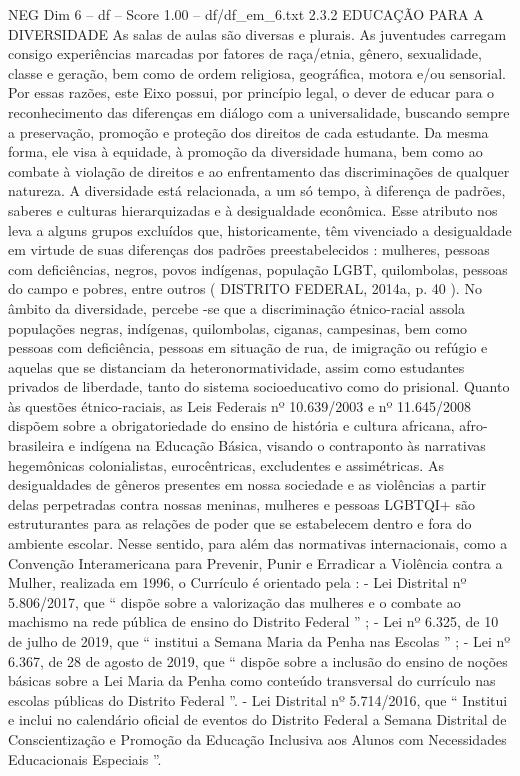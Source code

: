 \begin{textsample}{NEG Dim 6 – df – Score 1.00 – df/df\_em\_6.txt}  \label{ex:f6_neg_170}
2.3.2 EDUCAÇÃO PARA A DIVERSIDADE As salas de aulas são diversas e plurais.
As juventudes carregam consigo experiências marcadas por fatores de raça/etnia, gênero, sexualidade, classe e geração, bem como de ordem religiosa, geográfica, motora e/ou sensorial.
Por essas razões, este Eixo possui, por princípio legal, o dever de educar para o reconhecimento das diferenças em diálogo com a universalidade, buscando sempre a preservação, promoção e proteção dos direitos de cada estudante.
Da mesma forma, ele visa à equidade, à promoção da diversidade humana, bem como ao combate à violação de direitos e ao enfrentamento das discriminações de qualquer natureza.
A diversidade está relacionada, a um só tempo, à diferença de padrões, saberes e culturas hierarquizadas e à desigualdade econômica.
Esse atributo nos leva a alguns grupos excluídos que, historicamente, têm vivenciado a desigualdade em virtude de suas diferenças dos padrões preestabelecidos : mulheres, pessoas com deficiências, negros, povos indígenas, população LGBT, quilombolas, pessoas do campo e pobres, entre outros ( DISTRITO FEDERAL, 2014a, p. 40 ).
No âmbito da diversidade, percebe -se que a discriminação étnico-racial assola populações negras, indígenas, quilombolas, ciganas, campesinas, bem como pessoas com deficiência, pessoas em situação de rua, de imigração ou refúgio e aquelas que se distanciam da heteronormatividade, assim como estudantes privados de liberdade, tanto do sistema socioeducativo como do prisional.
Quanto às questões étnico-raciais, as Leis Federais nº 10.639/2003 e nº 11.645/2008 dispõem sobre a obrigatoriedade do ensino de história e cultura africana, afro-brasileira e indígena na Educação Básica, visando o contraponto às narrativas hegemônicas colonialistas, eurocêntricas, excludentes e assimétricas.
As desigualdades de gêneros presentes em nossa sociedade e as violências a partir delas perpetradas contra nossas meninas, mulheres e pessoas LGBTQI+ são estruturantes para as relações de poder que se estabelecem dentro e fora do ambiente escolar.
Nesse sentido, para além das normativas internacionais, como a Convenção Interamericana para Prevenir, Punir e Erradicar a Violência contra a Mulher, realizada em 1996, o Currículo é orientado pela : - Lei Distrital nº 5.806/2017, que “ dispõe sobre a valorização das mulheres e o combate ao machismo na rede pública de ensino do Distrito Federal ” ; - Lei nº 6.325, de 10 de julho de 2019, que “ institui a Semana Maria da Penha nas Escolas ” ; - Lei nº 6.367, de 28 de agosto de 2019, que “ dispõe sobre a inclusão do ensino de noções básicas sobre a Lei Maria da Penha como conteúdo transversal do currículo nas escolas públicas do Distrito Federal ”. - Lei Distrital nº 5.714/2016, que “ Institui e inclui no calendário oficial de eventos do Distrito Federal a Semana Distrital de Conscientização e Promoção da Educação Inclusiva aos Alunos com Necessidades Educacionais Especiais ”.

\end{textsample}
